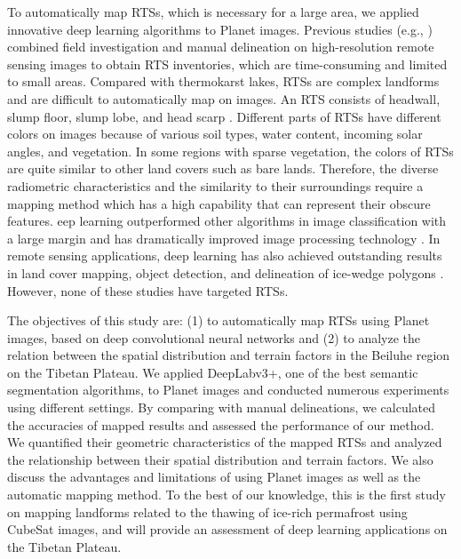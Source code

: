 \documentclass[authoryear,preprint,review,12pt]{elsarticle}
\begin{document}
To automatically map RTSs, which is necessary for a large area, we applied innovative deep learning algorithms to Planet images. Previous studies (e.g., \citealp{ramage_terrain_2017, lantuit_fifty_2008, niu2014thaw}) combined field investigation and manual delineation on high-resolution remote sensing images to obtain RTS inventories, which are time-consuming and limited to small areas. Compared with thermokarst lakes, RTSs are complex landforms and are difficult to automatically map on images. An RTS consists of headwall, slump floor, slump lobe, and head scarp \citep{lantuit_fifty_2008}. Different parts of RTSs have different colors on images because of various soil types, water content, incoming solar angles, and vegetation. In some regions with sparse vegetation, the colors of RTSs are quite similar to other land covers such as bare lands. Therefore, the diverse radiometric characteristics and the similarity to their surroundings require a mapping method which has a high capability that can represent their obscure features. eep learning outperformed other algorithms in image classification with a large margin \citep{krizhevsky_imagenet_2012} and has dramatically improved image processing technology \citep{lecun_deep_2015}. In remote sensing applications, deep learning has also achieved outstanding results in land cover mapping, object detection, and delineation of ice-wedge polygons \textnormal{\citep{guo_geospatial_2018, zhang2018deep,abolt2019brief}}. However, none of these studies have targeted RTSs. 

The objectives of this study are: (1) to automatically map RTSs using Planet images, based on deep convolutional neural networks and (2) to analyze the relation between the spatial distribution and terrain factors in the Beiluhe region on the Tibetan Plateau. We applied DeepLabv3+, one of the best semantic segmentation algorithms, to Planet images and conducted numerous experiments using different settings. By comparing with manual delineations, we calculated the accuracies of mapped results and assessed the performance of our method. We quantified their geometric characteristics of the mapped RTSs and analyzed the relationship between their spatial distribution and terrain factors. We also discuss the advantages and limitations of using Planet images as well as the automatic mapping method. 
To the best of our knowledge, this is the first study on mapping landforms related to the thawing of ice-rich permafrost using CubeSat images, and will provide an assessment of deep learning applications on the Tibetan Plateau.
\end{document}
